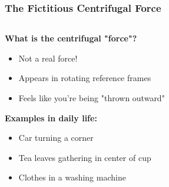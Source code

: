 \documentclass{beamer}
\begin{document}
\begin{frame}

\frametitle{The Fictitious Centrifugal Force}

\begin{columns}[T]
\begin{column}{0.6\textwidth}
\textbf{What is the centrifugal "force"?}
\begin{itemize}
    \item Not a real force!
    \item Appears in rotating reference frames
    \item Feels like you're being "thrown outward"
\end{itemize}

\pause

\textbf{Examples in daily life:}
\begin{itemize}
    \item Car turning a corner
    \item Tea leaves gathering in center of cup
    \item Clothes in a washing machine
\end{itemize}
\end{column}

\begin{column}{0.4\textwidth}

\end{column}
\end{columns}

\vspace{0.3cm}
\end{frame}
\end{document}
